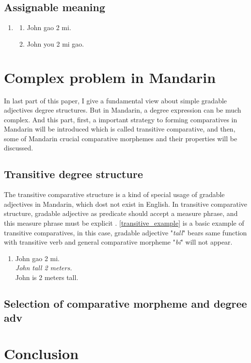 \documentclass{ctexart}
\let \cite \parencite
\begin{document}
\subsection{Assignable meaning}

\begin{enumerate}[resume]
    \item
    \begin{enumerate}[ref=(\arabic{enumi}\alph*)]
        \item John gao 2 mi.
        \item John you 2 mi gao.
    \end{enumerate}
\end{enumerate}

\section{Complex problem in Mandarin}

In last part of this paper, I give a fundamental view about simple gradable adjectives degree structures. But in Mandarin, a degree expression can be much complex. And this part, first, a important strategy to forming comparatives in Mandarin will be introduced which is called transitive comparative, and then, some of Mandarin crucial comparative morphemes and their properties will be discussed.

\subsection{Transitive degree structure}

The transitive comparative structure is a kind of special usage of gradable adjectives in Mandarin, which dost not exist in English. In transitive comparative structure, gradable adjective as predicate should accept a measure phrase, and this measure phrase must be explicit \cite{grano2012}. \ref{transitive_example} is a basic example of transitive comparatives, in this case, gradable adjective "\textit{tall}" bears same function with transitive verb and general comparative morpheme "\textit{bi}" will not appear. 

\begin{enumerate}[resume]
    \item \label{transitive_example}
    John gao 2 mi. \\
    \textit{John tall 2 meters.} \\
    John is 2 meters tall.
\end{enumerate}

\subsection{Selection of comparative morpheme and degree adv}


\section{Conclusion}

\newpage

\printbibliography
\end{document}

